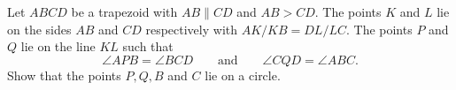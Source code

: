 Let $ABCD$ be a trapezoid with $AB \parallel CD$ and $AB > CD$.
The points $K$ and $L$ lie on the sides $AB$ and $CD$ respectively with $AK/KB = DL/LC$.
The points $P$ and $Q$ lie on the line $KL$ such that
$$\angle APB = \angle BCD \qquad \text{and} \qquad \angle CQD = \angle ABC.$$
Show that the points $P,Q,B$ and $C$ lie on a circle.